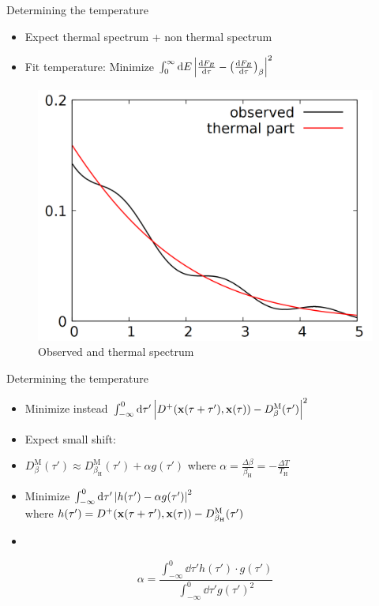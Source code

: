 \documentclass{beamer}
\newcommand{\upd}[1]{^\mathrm{#1}}
\newcommand{\ind}[1]{_\mathrm{#1}}
\begin{document}
\begin{frame}{Determining the temperature}
\begin{itemize}
	\item Expect thermal spectrum + non thermal spectrum
	\item Fit temperature: Minimize \(\int_0^\infty \dd{E} \qty|\dv{F_E}{\tau} - \qty(\dv{F_{E}}{\tau})_\beta|^2\)
\end{itemize}
\begin{figure}
\centering
\includegraphics[scale=0.15]{plot/thermal_fit.png}
\caption{Observed and thermal spectrum}
\end{figure}
\end{frame}

\begin{frame}{Determining the temperature}
\begin{itemize}
	\item Minimize instead \(\int_{-\infty}^0 \dd{\tau'} \qty|D^+(\vb{x}(\tau + \tau'), \vb{x}(\tau)) - D_\beta\upd{M}(\tau')|^2\)
	\item Expect small shift: 
	\item[] \(D_\beta\upd{M}(\tau') \approx D_{\beta\ind{H}}\upd{M}(\tau') + \alpha g(\tau')\) where \(\alpha = \frac{\Delta\beta}{\beta\ind{H}} = - \frac{\Delta T}{T\ind{H}}\)
	\item Minimize \(\int_{-\infty}^0 \dd{\tau'} \qty|h(\tau') - \alpha g(\tau')|^2\)\\
	where \(h(\tau') = D^+(\vb{x}(\tau + \tau'), \vb{x}(\tau)) - D_{\beta\ind{H}}\upd{M}(\tau')\)
	\item[]
\end{itemize}
\[\alpha = \frac{\int_{-\infty}^0 \dd{\tau'} h(\tau')\cdot g(\tau')}{\int_{-\infty}^0 \dd{\tau'} g(\tau')^2}\] 
\end{frame}
\end{document}
